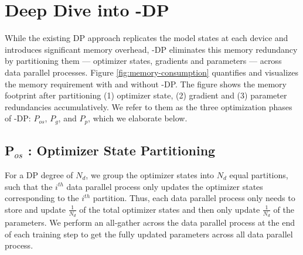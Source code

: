 
\section{Deep Dive into \name-DP}\label{sec:memoryoptimization}
While the existing DP approach replicates the model states at each device and introduces significant memory overhead, \name-DP eliminates this memory redundancy by partitioning them --- optimizer states, gradients and parameters --- across data parallel processes.  
Figure \ref{fig:memory-consumption} quantifies and visualizes the memory requirement with and without \name-DP. The figure shows the memory footprint after partitioning (1) optimizer state, (2) gradient and (3) parameter redundancies accumulatively.  We refer to them as the three optimization phases of \name-DP: $P_{os}$, $P_g$, and $P_p$, which we elaborate below. 
\begin{comment}
Furthermore, \name removes large buffers proportional to model size with performance-efficient constant-size buffers (Section \ref{sec:buffer}) to address the memory overhead of large temporary buffers.  The memory optimizations require careful computation, communication rescheduling and mapping across data parallel process. 
Next we go through each of these techniques in details.
\end{comment}
\subsection{P$_{os}$ : Optimizer State Partitioning }\label{sec:pos}
For a DP degree of $N_d$, we group the optimizer states into $N_d$ equal partitions, such that the $i^{th}$ data parallel process only updates the optimizer states corresponding to the $i^{th}$ partition. Thus, each data parallel process only needs to store and update $\frac{1}{N_d}$ of the total optimizer states and then only update $\frac{1}{N_d}$ of the parameters.
We perform an all-gather across the data parallel process at the end of each training step to get the fully updated parameters across all data parallel process. %

